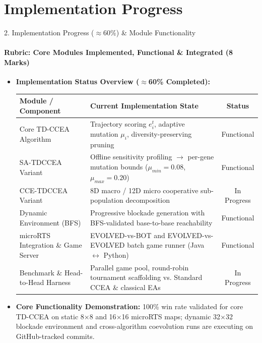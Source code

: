 \documentclass[aspectratio=169, 11pt]{beamer}
\begin{document}
\section{Implementation Progress}
\begin{frame}{2. Implementation Progress ($\approx$60\%) \& Module Functionality}
    \framesubtitle{Rubric: Core Modules Implemented, Functional \& Integrated (8 Marks)}
    
    {\small
    \begin{itemize}
        \item \textbf{Implementation Status Overview ($\approx$60\% Completed):}
        
        {\scriptsize
        \begin{table}
            \centering
            \renewcommand{\arraystretch}{1.05}
            \begin{tabular}{p{3.5cm} p{4.5cm} c}
                \toprule
                \textbf{Module / Component} & \textbf{Current Implementation State} & \textbf{Status} \\
                \midrule
                Core TD-CCEA Algorithm & Trajectory scoring $e_i^t$, adaptive mutation $\mu_i$, diversity-preserving pruning & Functional \\
                SA-TDCCEA Variant & Offline sensitivity profiling $\to$ per-gene mutation bounds ($\mu_{min}{=}0.08$, $\mu_{max}{=}0.20$) & Functional \\
                CCE-TDCCEA Variant & 8D macro / 12D micro cooperative sub-population decomposition & In Progress \\
                Dynamic Environment (BFS) & Progressive blockade generation with BFS-validated base-to-base reachability & Functional \\
                microRTS Integration \& Game Server & EVOLVED-vs-BOT and EVOLVED-vs-EVOLVED batch game runner (Java $\leftrightarrow$ Python) & Functional \\
                Benchmark \& Head-to-Head Harness & Parallel game pool, round-robin tournament scaffolding vs. Standard CCEA \& classical EAs & In Progress \\
                \bottomrule
            \end{tabular}
        \end{table}
        }
        
        \item \textbf{Core Functionality Demonstration:} 100\% win rate validated for core TD-CCEA on static 8$\times$8 and 16$\times$16 microRTS maps; dynamic 32$\times$32 blockade environment and cross-algorithm coevolution runs are executing on GitHub-tracked commits.
    \end{itemize}
    }
    
\end{frame} 
\end{document}
